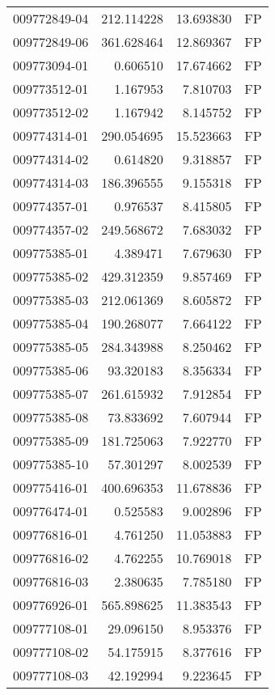 \begin{tabular}{lrrl}
009772849-04 &  212.114228 &    13.693830 &   FP \\
009772849-06 &  361.628464 &    12.869367 &   FP \\
009773094-01 &    0.606510 &    17.674662 &   FP \\
009773512-01 &    1.167953 &     7.810703 &   FP \\
009773512-02 &    1.167942 &     8.145752 &   FP \\
009774314-01 &  290.054695 &    15.523663 &   FP \\
009774314-02 &    0.614820 &     9.318857 &   FP \\
009774314-03 &  186.396555 &     9.155318 &   FP \\
009774357-01 &    0.976537 &     8.415805 &   FP \\
009774357-02 &  249.568672 &     7.683032 &   FP \\
009775385-01 &    4.389471 &     7.679630 &   FP \\
009775385-02 &  429.312359 &     9.857469 &   FP \\
009775385-03 &  212.061369 &     8.605872 &   FP \\
009775385-04 &  190.268077 &     7.664122 &   FP \\
009775385-05 &  284.343988 &     8.250462 &   FP \\
009775385-06 &   93.320183 &     8.356334 &   FP \\
009775385-07 &  261.615932 &     7.912854 &   FP \\
009775385-08 &   73.833692 &     7.607944 &   FP \\
009775385-09 &  181.725063 &     7.922770 &   FP \\
009775385-10 &   57.301297 &     8.002539 &   FP \\
009775416-01 &  400.696353 &    11.678836 &   FP \\
009776474-01 &    0.525583 &     9.002896 &   FP \\
009776816-01 &    4.761250 &    11.053883 &   FP \\
009776816-02 &    4.762255 &    10.769018 &   FP \\
009776816-03 &    2.380635 &     7.785180 &   FP \\
009776926-01 &  565.898625 &    11.383543 &   FP \\
009777108-01 &   29.096150 &     8.953376 &   FP \\
009777108-02 &   54.175915 &     8.377616 &   FP \\
009777108-03 &   42.192994 &     9.223645 &   FP \\

\end{tabular}
